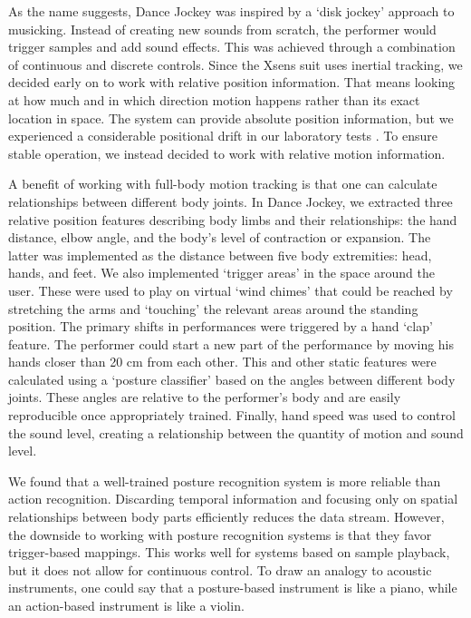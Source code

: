 As the name suggests, Dance Jockey was inspired by a `disk jockey' approach to musicking. Instead of creating new sounds from scratch, the performer would trigger samples and add sound effects. This was achieved through a combination of continuous and discrete controls. Since the Xsens suit uses inertial tracking, we decided early on to work with relative position information. That means looking at how much and in which direction motion happens rather than its exact location in space. The system can provide absolute position information, but we experienced a considerable positional drift in our laboratory tests \citep{skogstad_osc_2011}. To ensure stable operation, we instead decided to work with relative motion information.

A benefit of working with full-body motion tracking is that one can calculate relationships between different body joints. In Dance Jockey, we extracted three relative position features describing body limbs and their relationships: the hand distance, elbow angle, and the body's level of contraction or expansion. The latter was implemented as the distance between five body extremities: head, hands, and feet. We also implemented `trigger areas' in the space around the user. These were used to play on virtual `wind chimes' that could be reached by stretching the arms and `touching' the relevant areas around the standing position. The primary shifts in performances were triggered by a hand `clap' feature. The performer could start a new part of the performance by moving his hands closer than 20 cm from each other. This and other static features were calculated using a `posture classifier' based on the angles between different body joints. These angles are relative to the performer's body and are easily reproducible once appropriately trained. Finally, hand speed was used to control the sound level, creating a relationship between the quantity of motion and sound level.

We found that a well-trained posture recognition system is more reliable than action recognition. Discarding temporal information and focusing only on spatial relationships between body parts efficiently reduces the data stream. However, the downside to working with posture recognition systems is that they favor trigger-based mappings. This works well for systems based on sample playback, but it does not allow for continuous control. To draw an analogy to acoustic instruments, one could say that a posture-based instrument is like a piano, while an action-based instrument is like a violin.

